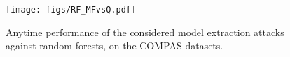 \begin{figure}[htb]
    \centering
    \texttt{[image: figs/RF\_MFvsQ.pdf]}
    \caption{Anytime performance of the considered model extraction attacks against random forests, on the COMPAS datasets.}
    \label{fig:MFvsQ_adultcompas_RFs}
\end{figure}